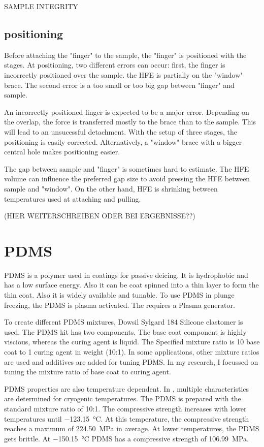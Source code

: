 SAMPLE INTEGRITY

\subsection{positioning}
\label{section:positioning}

Before attaching the "finger" to the sample, the "finger" is positioned with the stages. At positioning, two different errors can occur: first, the finger is incorrectly positioned over the sample. the HFE is partially on the "window" brace. The second error is a too small or too big gap between "finger" and sample. 

An incorrectly positioned finger is expected to be a major error. Depending on the overlap, the force is transferred mostly to the brace than to the sample. This will lead to an unsucessful detachment. With the setup of three stages, the positioning is easily corrected. Alternatively, a "window" brace with a bigger central hole makes positioning easier.

The gap between sample and "finger" is sometimes hard to estimate. The HFE volume can influence the preferred gap size to avoid pressing the HFE between sample and "window". On the other hand, HFE is shrinking between temperatures used at attaching and pulling.

 (HIER WEITERSCHREIBEN ODER BEI ERGEBNISSE??) 

\section{PDMS}

PDMS is a polymer used in coatings for passive deicing. It is hydrophobic and has a low surface energy. Also it can be coat spinned into a thin layer to form the thin coat. Also it is widely available and tunable. To use PDMS in plunge freezing, the PDMS is plasma activated. The requires a Plasma generator.

To create different PDMS mixtures, Dowsil Sylgard 184 Silicone elastomer is used\cite{DOW.}. The PDMS kit has two components. The base coat component is highly viscious, whereas the curing agent is liquid. The Specified mixture ratio is 10 base coat to 1 curing agent in weight (10:1). In some applications, other mixture ratios are used and additives are added for tuning PDMS. In my research, I focussed on tuning the mixture ratio of base coat to curing agent. 

PDMS properties are also temperature dependent. In \cite{Zhang.2020}, multiple characteristics are determined for cryogenic temperatures. The PDMS is prepared with the standard mixture ratio of 10:1. The compressive strength increases with lower temperatures until \SI{-123.15}{\degreeCelsius}. At this temperature, the compressive strength reaches a maximum of \SI{224.50}{\mega\pascal} in average. At lower temperatures, the PDMS gets brittle. At \SI{-150.15}{\degreeCelsius} PDMS has a compressive strength of \SI{106.99}{\mega\pascal}.

